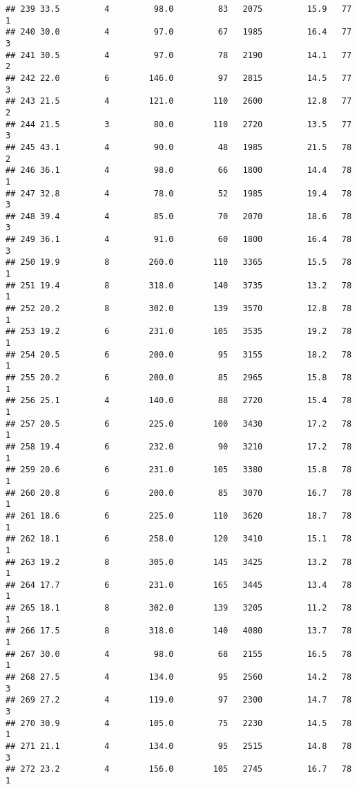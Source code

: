 \documentclass[
]{article}
\begin{document}
\begin{verbatim}
## 239 33.5         4         98.0         83   2075         15.9   77      1
## 240 30.0         4         97.0         67   1985         16.4   77      3
## 241 30.5         4         97.0         78   2190         14.1   77      2
## 242 22.0         6        146.0         97   2815         14.5   77      3
## 243 21.5         4        121.0        110   2600         12.8   77      2
## 244 21.5         3         80.0        110   2720         13.5   77      3
## 245 43.1         4         90.0         48   1985         21.5   78      2
## 246 36.1         4         98.0         66   1800         14.4   78      1
## 247 32.8         4         78.0         52   1985         19.4   78      3
## 248 39.4         4         85.0         70   2070         18.6   78      3
## 249 36.1         4         91.0         60   1800         16.4   78      3
## 250 19.9         8        260.0        110   3365         15.5   78      1
## 251 19.4         8        318.0        140   3735         13.2   78      1
## 252 20.2         8        302.0        139   3570         12.8   78      1
## 253 19.2         6        231.0        105   3535         19.2   78      1
## 254 20.5         6        200.0         95   3155         18.2   78      1
## 255 20.2         6        200.0         85   2965         15.8   78      1
## 256 25.1         4        140.0         88   2720         15.4   78      1
## 257 20.5         6        225.0        100   3430         17.2   78      1
## 258 19.4         6        232.0         90   3210         17.2   78      1
## 259 20.6         6        231.0        105   3380         15.8   78      1
## 260 20.8         6        200.0         85   3070         16.7   78      1
## 261 18.6         6        225.0        110   3620         18.7   78      1
## 262 18.1         6        258.0        120   3410         15.1   78      1
## 263 19.2         8        305.0        145   3425         13.2   78      1
## 264 17.7         6        231.0        165   3445         13.4   78      1
## 265 18.1         8        302.0        139   3205         11.2   78      1
## 266 17.5         8        318.0        140   4080         13.7   78      1
## 267 30.0         4         98.0         68   2155         16.5   78      1
## 268 27.5         4        134.0         95   2560         14.2   78      3
## 269 27.2         4        119.0         97   2300         14.7   78      3
## 270 30.9         4        105.0         75   2230         14.5   78      1
## 271 21.1         4        134.0         95   2515         14.8   78      3
## 272 23.2         4        156.0        105   2745         16.7   78      1

\end{verbatim}
\end{document}
